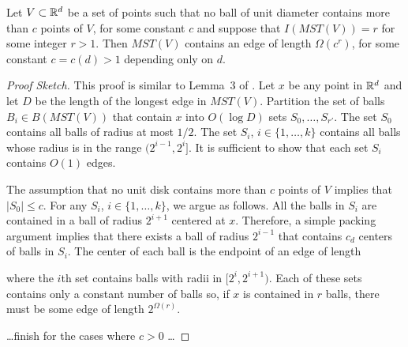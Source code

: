 \documentclass{patmorin}
\newcommand{\mst}{\mathit{MST}}
\begin{document}
\begin{lem}
  Let $V\subset\mathbb{R}^d$ be a set of points such that no ball of unit
  diameter contains more than $c$ points of $V$, for some constant $c$
  and suppose that $I(MST(V))=r$ for some integer $r>1$.  Then $MST(V)$
  contains an edge of length $\Omega(c^r)$, for some constant $c=c(d)>1$
  depending only on $d$.
\end{lem}

\begin{proof}[Proof Sketch]
This proof is similar to Lemma~3 of
\cite{msz11}. Let $x$ be any point in $\mathbb{R}^d$ and let $D$ be the length
of the longest edge in $\mst(V)$.  Partition the set
of balls $B_i\in B(\mst(V))$ that contain $x$ into
$O(\log D)$ sets $S_0,\ldots,S_{r'}$. The set $S_0$ contains all balls of radius at most $1/2$.  The set $S_i$, $i\in\{1,\ldots,k\}$ contains all balls whose radius is in the range $(2^{i-1},2^i]$.  It is sufficient to show that each set $S_i$ contains $O(1)$ edges.

The assumption that no unit disk contains more than $c$ points of $V$
implies that $|S_0|\le c$.  For any $S_i$, $i\in\{1,\ldots,k\}$, we argue
as follows.  All the balls in $S_i$ %
are contained in a ball of radius $2^{i+1}$ centered at $x$.  Therefore, a simple packing argument implies that there exists a ball of radius $2^{i-1}$ that contains $c_d$ centers of balls in $S_i$.  The center of each ball is the endpoint of an edge of length 


where the $i$th set contains balls with radii in
$[2^i,2^{i+1})$.  Each of these sets contains only a constant number of
balls so, if $x$ is contained in $r$ balls, there must be some edge of
length $2^{\Omega(r)}$.

\noindent\ldots finish for the cases where $c>0$ \ldots
\end{proof}
\end{document}
